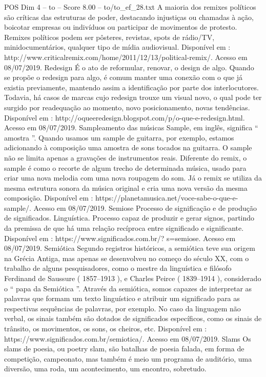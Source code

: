 \begin{textsample}{POS Dim 4 – to – Score 8.00 – to/to\_ef\_28.txt}
A maioria dos remixes políticos são críticas das estruturas de poder, destacando injustiças ou chamadas à ação, boicotar empresas ou indivíduos ou participar de movimentos de protesto.
Remixes políticos podem ser pôsteres, revistas, spots de rádio/TV, minidocumentários, qualquer tipo de mídia audiovisual.
Disponível em : http://www.criticalremix.com/home/2011/12/13/political-remix/.
Acesso em 08/07/2019.
Redesign É o ato de reformular, renovar, o design de algo.
Quando se propõe o redesign para algo, é comum manter uma conexão com o que já existia previamente, mantendo assim a identificação por parte dos interlocutores.
Todavia, há casos de marcas cujo redesign trouxe um visual novo, o qual pode ter surgido por readequação ao momento, novo posicionamento, novas tendências.
Disponível em : http://oqueeredesign.blogspot.com/p/o-que-e-redesign.html.
Acesso em 08/07/2019.
Sampleamento das músicas Sample, em inglês, significa “ amostra ”.
Quando usamos um sample de guitarra, por exemplo, estamos adicionando à composição uma amostra de sons tocados na guitarra.
O sample não se limita apenas a gravações de instrumentos reais.
Diferente do remix, o sample é como o recorte de algum trecho de determinada música, usado para criar uma nova melodia com uma nova roupagem do som.
Já o remix se utiliza da mesma estrutura sonora da música original e cria uma nova versão da mesma composição.
Disponível em : https://planetamusica.net/voce-sabe-o-que-e-sample/.
Acesso em 08/07/2019.
Semiose Processo de significação e de produção de significados.
Linguística.
Processo capaz de produzir e gerar signos, partindo da premissa de que há uma relação recíproca entre significado e significante.
Disponível em : https://www.significados.com.br/? s=semiose.
Acesso em 08/07/2019.
Semiótica Segundo registros históricos, a semiótica teve sua origem na Grécia Antiga, mas apenas se desenvolveu no começo do século XX, com o trabalho de alguns pesquisadores, como o mestre da linguística e filósofo Ferdinand de Saussure ( 1857–1913 ), e Charles Peirce ( 1839–1914 ), considerado o “ papa da Semiótica ”.
Através da semiótica, somos capazes de interpretar as palavras que formam um texto linguístico e atribuir um significado para as respectivas sequências de palavras, por exemplo.
No caso da linguagem não verbal, os sinais também são dotados de significados específicos, como os sinais de trânsito, os movimentos, os sons, os cheiros, etc.
Disponível em : https://www.significados.com.br/semiotica/.
Acesso em 08/07/2019.
Slams Os slams de poesia, ou poetry slam, são batalhas de poesia falada, em forma de competição, campeonato, mas também é meio um programa de auditório, uma diversão, uma roda, um acontecimento, um encontro, sobretudo.

\end{textsample}
